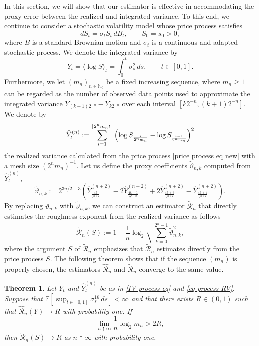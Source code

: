 \documentclass[12pt,reqno]{article}
\DeclarePairedDelimiter\floor{\lfloor}{\rfloor}
\def\ua{\uparrow}
\def\wh{\widehat}
\def\wt{\widetilde}
\numberwithin{equation}{section}
\def\cR{{\mathscr R}}
\newtheorem{theorem}{Theorem}[section]
\theoremstyle{definition}
\def\<{\langle}
\def\>{\rangle}
\def\wt#1{\widetilde{#1}}
\def\ua{\uparrow}
\def\wh{\widehat}
\def\wt{\widetilde}
\newcommand{\bE}{\mathbb{E}}
\newcommand{\bN}{\mathbb{N}}
\begin{document}
In this section, we will show that our estimator is effective in accommodating the proxy error between the realized and integrated variance. To this end, we continue to consider a stochastic volatility model whose price process satisfies
\begin{equation}\label{price process eq new}
dS_t=\sigma_tS_t\,dB_t,\qquad S_0=s_0>0,
\end{equation}
where $B$ is a standard Brownian motion and $\sigma_t$ is a continuous and adapted stochastic process.  We denote the integrated variance by
\begin{equation}\label{IV process eq}
	Y_t = \<\log S\>_t = \int_0^t \sigma^2_s\,ds, \qquad t \in [0,1].
\end{equation}
Furthermore, we let $(m_n)_{n \in \bN_0}$ be a fixed increasing sequence, where $m_n \ge 1$ can be regarded as the number of observed data points used to approximate the integrated variance 
$Y_{(k+1)2^{-n}}-Y_{k2^{-n}}$
over each interval $[k2^{-n},(k+1)2^{-n}]$. We denote
by
\begin{equation}\label{eq process RV}
	\wh Y^{(n)}_t := \sum_{i = 1}^{\floor{2^{n}m_nt}}\left(\log S_{\frac{i}{2^n m_n}} - \log S_{\frac{i-1}{2^n m_n}} \right)^2
\end{equation}
the realized variance calculated from the price process \eqref{price process eq new} with a mesh size $(2^n m_n)^{-1}$. Let us define the proxy coefficients $\wt \vartheta_{n,k}$ computed from $\wh Y^{(n)}_t$,
\begin{equation}\label{eq wt vartheta}
	\wt \vartheta_{n,k} := 2^{3n/2+3}\left(\wh Y^{(n+2)}_{\frac{4k}{2^{n+2}}} - 2\wh Y^{(n+2)}_{\frac{4k+1}{2^{n+2}}} + 2\wh Y^{(n+2)}_{\frac{4k+3}{2^{n+2}}} - \wh Y^{(n+2)}_{\frac{4k+4}{2^{n+2}}}\right).
\end{equation}
By replacing $\vartheta_{n,k}$ with $\wt \vartheta_{n,k}$, we can construct an estimator $\wt \cR_n$ that directly estimates the roughness exponent from the realized variance as follows 
\begin{equation*}
	\wt \cR_n(S) := 1 - \frac{1}{n}\log_2 \sqrt{\sum_{k = 0}^{2^n-1}\wt \vartheta^2_{n,k}},
\end{equation*}
where the argument  $S$ of $\wt \cR_n$ emphasizes that $\wt \cR_n$ estimates directly from the price process $S$. The following theorem shows that if the sequence $(m_n)$ is properly chosen, the estimators $\wh \cR_n$ and $\wt \cR_n$ converge to the same value. 


\begin{theorem}\label{thm main realized}
	Let $Y_t$ and $\wh Y^{(n)}_t$ be as in \eqref{IV process eq} and \eqref{eq process RV}. Suppose that $\bE\left[\sup_{t \in [0,1]}\sigma^{16}_s\,ds\right] < \infty$ and that there exists $R \in (0,1)$ such that $\wh \cR_n(Y) \rightarrow R$ with probability one. If 
	\begin{equation}\label{RV condition eq}
		\lim_{n \ua \infty}\frac{1}{n}\log_2 m_n > 2R,
	\end{equation}
	then $\wt \cR_n(S) \rightarrow R$ as $n \ua \infty$ with probability one.
\end{theorem}
\end{document}
